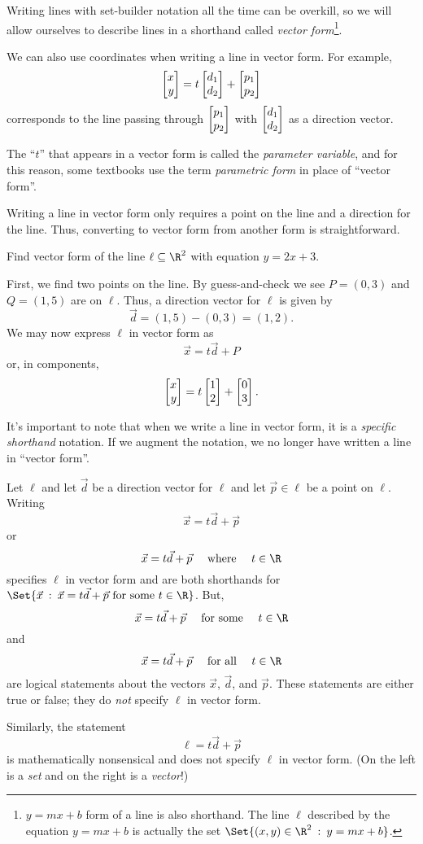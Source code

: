 Writing lines with set-builder notation all the time can be overkill,
so we will allow ourselves to describe lines in a shorthand called \emph{vector form}\footnote{
	$y=mx+b$ form of a line is also shorthand.  The line $\ell$ described by the equation
	$y=mx+b$ is actually the set $\Set{(x,y)\in\R^2\given y=mx+b}$.
}.


We can also use coordinates when writing a line in vector form. For example,
\[
	\mat{x\\y}=t\mat{d_1\\d_2}+\mat{p_1\\p_2}
\]
corresponds to the line passing through $\mat{p_1\\p_2}$ with $\mat{d_1\\d_2}$ as a direction vector.

The ``$t$'' that appears in a vector form is called the \emph{parameter variable}, and for this
reason, some textbooks use the term \emph{parametric form} in place of ``vector form''. 

Writing a line in vector form only requires a point on the line and a direction for the line.
Thus, converting to vector form from another form is straightforward.
\begin{example}
	Find vector form of the line $\ell\subseteq\R^2$ with equation $y=2x+3$.

	First, we find two
	points on the line.  By guess-and-check we see $P=(0,3)$ and $Q=(1,5)$ are on $\ell$.
	Thus, a direction vector for $\ell$ is given by
	\[
		\vec d = (1,5)-(0,3)=(1,2).
	\]
	We may now express $\ell$ in vector form as
	\[
		\vec x=t\vec d+P
	\]
	or, in components,
	\[
		\mat{x\\y} = t\mat{1\\2}+\mat{0\\3}.
	\]
\end{example}

It's important to note that when we write a line in vector form, it is a \emph{specific shorthand} notation.
If we augment the notation, we no longer have written a line in ``vector form''.

\begin{example} Let $\ell$ and let $\vec d$ be a direction vector for $\ell$ and let $\vec p\in \ell$
	be a point on $\ell$. Writing
	\[
		\vec x=t\vec d+\vec p
	\]
	or 
	\[
		\vec x=t\vec d+\vec p\quad\text{ where }\quad t\in \R
	\]
	specifies $\ell$ in vector form and are both shorthands for $\Set{\vec x\given
	\vec x=t\vec d+\vec p\text{ for some }t\in \R}$. But,
	\[
		\vec x=t\vec d+\vec p\quad\text{ for some }\quad t\in \R
	\]
	and
	\[
		\vec x=t\vec d+\vec p\quad\text{ for all }\quad t\in \R
	\]
	are logical statements about the vectors $\vec x$, $\vec d$, and
	$\vec p$. These statements are either true or false; they do \emph{not} 
	specify $\ell$ in vector form.

	Similarly, the statement
	\[
		\ell = t\vec d+\vec p
	\]
	is mathematically nonsensical and does not specify $\ell$ in vector form. (On the
	left is a \emph{set} and on the right is a \emph{vector}!)

\end{example}


